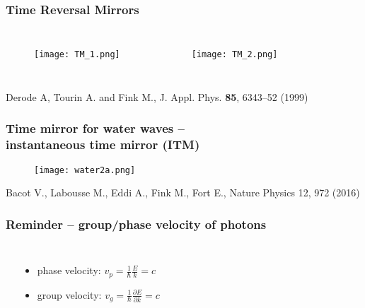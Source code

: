 \documentclass{beamer}
\begin{document}
\begin{frame}[t] %
 \frametitle{Time Reversal Mirrors}
\begin{columns}
    \begin{figure}\centering
     \texttt{[image: TM\_1.png]}
    \end{figure}
    \begin{figure}\centering
     \texttt{[image: TM\_2.png]}
    \end{figure}
\end{columns}
\vspace{\fill}
{\footnotesize \alert{ Derode A, Tourin A. and Fink M.}, J. Appl. Phys. \textbf{85}, 6343–52 (1999)}
\end{frame}



\begin{frame}%
\frametitle{Time mirror for water waves -- \\instantaneous time mirror (ITM)}
    \begin{figure}\centering
      \texttt{[image: water2a.png]}
    \end{figure}
\vspace{\fill}
{\footnotesize \alert{Bacot V., Labousse M., Eddi A., Fink M., Fort E.}, Nature Physics 12, 972 (2016)}
\end{frame}

\begin{frame}%
  \frametitle{Reminder -- group/phase velocity of photons}
  
  \begin{columns}
  \begin{center}
  \end{center}
  \begin{itemize}
    \item phase velocity: $v_p = \frac{1 }{\hbar} \frac{ E }{k} = c$
    \item group velocity: $v_g = \frac{1 }{\hbar} \frac{\partial E }{\partial k} = c$
  \end{itemize}
  
  
  
  \end{columns}
\end{frame}
\end{document}
